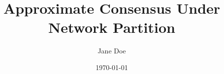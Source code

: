 \documentclass[b5paper,twoside]{jb-thesis}
\author{Jane Doe}
\title{Approximate Consensus Under Network Partition}
\date{\today}
\begin{document}
\begin{preliminary}
  \maketitle
  \tableofcontents
  
\end{preliminary}






\end{document}

